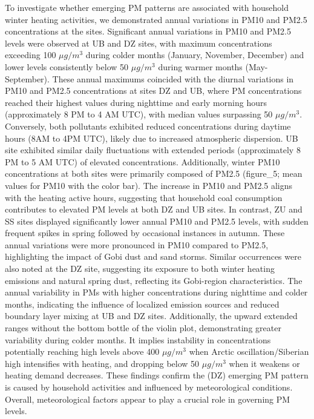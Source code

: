 \documentclass[
  11pt,
]{article}
\begin{document}
To investigate whether emerging PM patterns are associated with
household winter heating activities, we demonstrated annual variations
in PM10 and PM2.5 concentrations at the sites. Significant annual
variations in PM10 and PM2.5 levels were observed at UB and DZ sites,
with maximum concentrations exceeding 100 \(\mu g/m^3\) during colder
months (January, November, December) and lower levels consistently below
50 \(\mu g/m^3\) during warmer months (May-September). These annual
maximums coincided with the diurnal variations in PM10 and PM2.5
concentrations at sites DZ and UB, where PM concentrations reached their
highest values during nighttime and early morning hours (approximately 8
PM to 4 AM UTC), with median values surpassing 50 \(\mu g/m^3\).
Conversely, both pollutants exhibited reduced concentrations during
daytime hours (8AM to 4PM UTC), likely due to increased atmospheric
dispersion. UB site exhibited similar daily fluctuations with extended
periods (approximately 8 PM to 5 AM UTC) of elevated concentrations.
Additionally, winter PM10 concentrations at both sites were primarily
composed of PM2.5 (figure\_5; mean values for PM10 with the color bar).
The increase in PM10 and PM2.5 aligns with the heating active hours,
suggesting that household coal consumption contributes to elevated PM
levels at both DZ and UB sites. In contrast, ZU and SS sites displayed
significantly lower annual PM10 and PM2.5 levels, with sudden frequent
spikes in spring followed by occasional instances in autumn. These
annual variations were more pronounced in PM10 compared to PM2.5,
highlighting the impact of Gobi dust and sand storms. Similar
occurrences were also noted at the DZ site, suggesting its exposure to
both winter heating emissions and natural spring dust, reflecting its
Gobi-region characteristics. The annual variability in PMs with higher
concentrations during nighttime and colder months, indicating the
influence of localized emission sources and reduced boundary layer
mixing at UB and DZ sites. Additionally, the upward extended ranges
without the bottom bottle of the violin plot, demonstrating greater
variability during colder months. It implies instability in
concentrations potentially reaching high levels above 400 \(\mu g/m^3\)
when Arctic oscillation/Siberian high intensifies with heating, and
dropping below 50 \(\mu g/m^3\) when it weakens or heating demand
decreases. These findings confirm the (DZ) emerging PM pattern is caused
by household activities and influenced by meteorological conditions.
Overall, meteorological factors appear to play a crucial role in
governing PM levels.
\end{document}
